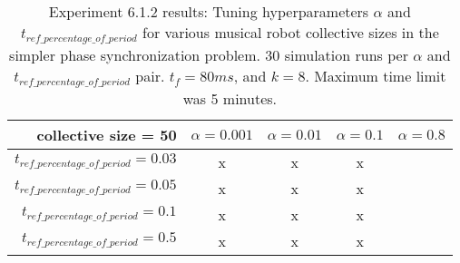 \begin{table}[t]
	\begin{minipage}{\textwidth}
		\centering
		\begin{tabular}{r | c c c c} \toprule
			collective size = 50
			  & {$\alpha = 0.001$} & {$\alpha = 0.01$} & {$\alpha = 0.1$} & {$\alpha = 0.8$} \\\hline
			{$t_{ref\_percentage\_of\_period} = 0.03$} & x & x & x \\
			{$t_{ref\_percentage\_of\_period} = 0.05$} & x & x & x \\
			{$t_{ref\_percentage\_of\_period} = 0.1$} & x & x & x \\
			{$t_{ref\_percentage\_of\_period} = 0.5$} & x & x & x
		\end{tabular}
	\end{minipage}
\caption*{Experiment 6.1.2 results:  Tuning hyperparameters $\alpha$ and $t_{ref\_percentage\_of\_period}$ for various musical robot collective sizes in the simpler phase synchronization problem. 30 simulation runs per $\alpha$ and $t_{ref\_percentage\_of\_period}$ pair. $t_f=80ms$, and $k=8$. Maximum time limit was 5 minutes.}
\end{table}